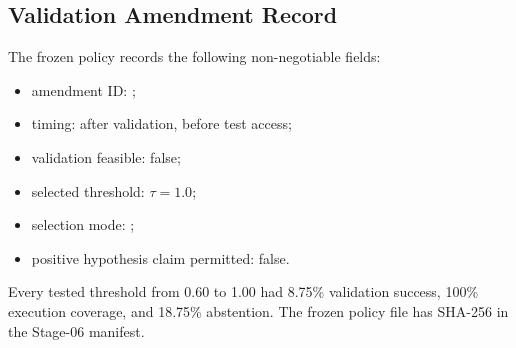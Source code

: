 \subsection{Validation Amendment Record}

The frozen policy records the following non-negotiable fields:

\begin{itemize}
    \item amendment ID:
    ;
    \item timing: after validation, before test access;
    \item validation feasible: false;
    \item selected threshold: $\tau=1.0$;
    \item selection mode:
    ;
    \item positive hypothesis claim permitted: false.
\end{itemize}

Every tested threshold from 0.60 to 1.00 had 8.75\% validation success, 100\%
execution coverage, and 18.75\% abstention. The frozen policy file has SHA-256
in the Stage-06 manifest.
